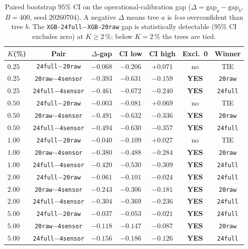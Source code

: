 \begin{table}[t]
\centering
\small
\caption{Paired bootstrap $95\%$ CI on the operational-calibration gap
($\Delta = \text{gap}_a - \text{gap}_b$, $B{=}400$, seed $20260704$).
A negative $\Delta$ means tree $a$ is \emph{less} overconfident than
tree $b$. The \texttt{XGB-24full}${-}$\texttt{XGB-20raw} gap is
statistically detectable ($95\%$ CI excludes zero) at
$K \ge 2\,\%$; below $K{=}2\,\%$ the trees are tied.}
\label{tab:p8-op-cal-boot}
\begin{tabular}{lcccccc}
\toprule
$K$(\%) & Pair & $\Delta$-gap & CI low & CI high & Excl.\ 0 & Winner \\
\midrule
$0.25$ & \texttt{24full}${-}$\texttt{20raw}   & $-0.068$ & $-0.206$ & $+0.071$  & no  & TIE \\
$0.25$ & \texttt{20raw}${-}$\texttt{4sensor}  & $-0.393$ & $-0.631$ & $-0.159$  & \textbf{YES} & \texttt{20raw} \\
$0.25$ & \texttt{24full}${-}$\texttt{4sensor} & $-0.461$ & $-0.672$ & $-0.240$  & \textbf{YES} & \texttt{24full} \\
$0.50$ & \texttt{24full}${-}$\texttt{20raw}   & $-0.003$ & $-0.081$ & $+0.069$  & no  & TIE \\
$0.50$ & \texttt{20raw}${-}$\texttt{4sensor}  & $-0.491$ & $-0.632$ & $-0.336$  & \textbf{YES} & \texttt{20raw} \\
$0.50$ & \texttt{24full}${-}$\texttt{4sensor} & $-0.494$ & $-0.630$ & $-0.357$  & \textbf{YES} & \texttt{24full} \\
$1.00$ & \texttt{24full}${-}$\texttt{20raw}   & $-0.040$ & $-0.109$ & $+0.027$  & no  & TIE \\
$1.00$ & \texttt{20raw}${-}$\texttt{4sensor}  & $-0.380$ & $-0.488$ & $-0.284$  & \textbf{YES} & \texttt{20raw} \\
$1.00$ & \texttt{24full}${-}$\texttt{4sensor} & $-0.420$ & $-0.530$ & $-0.309$  & \textbf{YES} & \texttt{24full} \\
$2.00$ & \texttt{24full}${-}$\texttt{20raw}   & $-0.061$ & $-0.101$ & $-0.024$  & \textbf{YES} & \texttt{24full} \\
$2.00$ & \texttt{20raw}${-}$\texttt{4sensor}  & $-0.243$ & $-0.306$ & $-0.181$  & \textbf{YES} & \texttt{20raw} \\
$2.00$ & \texttt{24full}${-}$\texttt{4sensor} & $-0.304$ & $-0.369$ & $-0.236$  & \textbf{YES} & \texttt{24full} \\
$5.00$ & \texttt{24full}${-}$\texttt{20raw}   & $-0.037$ & $-0.053$ & $-0.021$  & \textbf{YES} & \texttt{24full} \\
$5.00$ & \texttt{20raw}${-}$\texttt{4sensor}  & $-0.118$ & $-0.147$ & $-0.087$  & \textbf{YES} & \texttt{20raw} \\
$5.00$ & \texttt{24full}${-}$\texttt{4sensor} & $-0.156$ & $-0.186$ & $-0.126$  & \textbf{YES} & \texttt{24full} \\
\bottomrule
\end{tabular}
\end{table}

